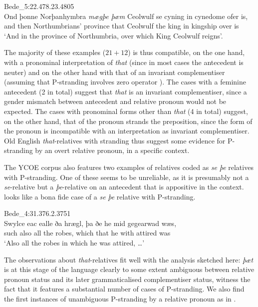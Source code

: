 \documentclass[output=paper]{langsci/langscibook}
\begin{document}
\ea Bede\_5:22.478.23.4805%
    \label{ex:11.11}\\
    \gll Ond þonne Norþanhymbra   \textit{mægþe}   \textit{þæm} Ceolwulf se    cyning in cynedome ofer is,   \\
        and then    Northumbrians’ province that   Ceolwulf  the king  in    kingship over is\\
    \glt ‘And in the province of Northumbria, over which King Ceolwulf reigns’.
\z

The majority of these examples ($21+12$) is thus compatible, on the one hand,
with a pronominal interpretation of \textit{that} (since in most cases the
antecedent is neuter) and on the other hand with that of an invariant
complementiser (assuming that P-stranding involves
zero operator ).  The cases with a feminine antecedent (2 in total)
suggest that \textit{that} is an invariant complementiser, since a gender
mismatch between antecedent and relative pronoun would not be expected. The
cases with pronominal forms other than \textit{that} (4 in total) suggest, on
the other hand, that  of the pronoun strands the preposition, since the
form of the pronoun is incompatible with an interpretation as invariant
complementiser. Old English \textit{that}-relatives with stranding thus suggest
some evidence for P-stranding by an overt relative pronoun, in a specific
context.

The YCOE corpus also features two examples of relatives coded as \textit{se} \textit{þe} relatives with P-stranding. One of these seems to be unreliable, as it is presumably not a \textit{se}-relative but a \textit{þe}-relative on an antecedent that is appositive in the context.  looks like a bona fide case of a \textit{se} \textit{þe} relative with P-stranding.

\ea Bede\_4:31.376.2.3751%
    \label{ex:11.13}\\
    \gll Swylce eac ealle ða  hrægl, þa       ðe   he mid gegearwad wæs, \\
        such    also all    the robes, which that he with attired was \\
    \glt ‘Also all the robes in which he was attired, …’
\z

The observations about \emph{that}-relatives fit well with the analysis
sketched here: \textit{þæt} is at this stage of the language clearly to some
extent ambiguous between relative pronoun status and its later grammaticalised
complementiser status, witness the fact that it features a substantial number
of cases of P-stranding. We also find the first
instances of unambiguous P-stranding by a relative pronoun as in
.
\end{document}
